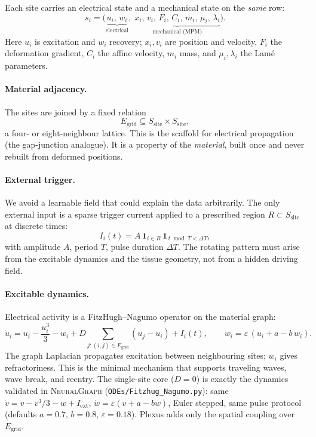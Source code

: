 \documentclass[11pt]{article}
\newcommand{\code}[1]{\texttt{#1}}
\begin{document}
Each site carries an electrical state and a mechanical state on the \emph{same} row:
\[
  s_i = \big(\underbrace{u_i,\,w_i}_{\text{electrical}},\;
              \underbrace{x_i,\,v_i,\,F_i,\,C_i,\,m_i,\,\mu_i,\,\lambda_i}_{\text{mechanical (MPM)}}\big).
\]
Here $u_i$ is excitation and $w_i$ recovery; $x_i,v_i$ are position and velocity,
$F_i$ the deformation gradient, $C_i$ the affine velocity, $m_i$ mass, and
$\mu_i,\lambda_i$ the Lam\'e parameters.

\paragraph{Material adjacency.}
The sites are joined by a fixed relation
\[
  E_{\mathrm{grid}}\subseteq S_{\mathrm{site}}\times S_{\mathrm{site}},
\]
a four- or eight-neighbour lattice. This is the scaffold for electrical propagation
(the gap-junction analogue). It is a property of the \emph{material}, built once and
never rebuilt from deformed positions.

\paragraph{External trigger.}
We avoid a learnable field that could explain the data arbitrarily. The only
external input is a sparse trigger current applied to a prescribed region
$R\subset S_{\mathrm{site}}$ at discrete times:
\[
  I_i(t)=A\,\mathbf{1}_{i\in R}\,\mathbf{1}_{\,t\bmod T < \Delta T},
\]
with amplitude $A$, period $T$, pulse duration $\Delta T$. The rotating pattern must
arise from the excitable dynamics and the tissue geometry, not from a hidden driving
field.

\paragraph{Excitable dynamics.}
Electrical activity is a FitzHugh--Nagumo operator on the material graph:
\[
  \dot u_i
    = u_i-\frac{u_i^3}{3}-w_i
      + D\!\!\sum_{j:(i,j)\in E_{\mathrm{grid}}}\!\!(u_j-u_i)
      + I_i(t),
  \qquad
  \dot w_i = \varepsilon\,(u_i+a-b\,w_i).
\]
The graph Laplacian propagates excitation between neighbouring sites; $w_i$ gives
refractoriness. This is the minimal mechanism that supports traveling waves, wave
break, and reentry. The single-site core ($D{=}0$) is exactly the dynamics validated
in \textsc{NeuralGraph} (\code{ODEs/Fitzhug\_Nagumo.py}): same
$\dot v=v-v^3/3-w+I_{\mathrm{ext}}$, $\dot w=\varepsilon(v+a-bw)$, Euler stepped,
same pulse protocol (defaults $a{=}0.7$, $b{=}0.8$, $\varepsilon{=}0.18$). Plexus
adds only the spatial coupling over $E_{\mathrm{grid}}$.
\end{document}
